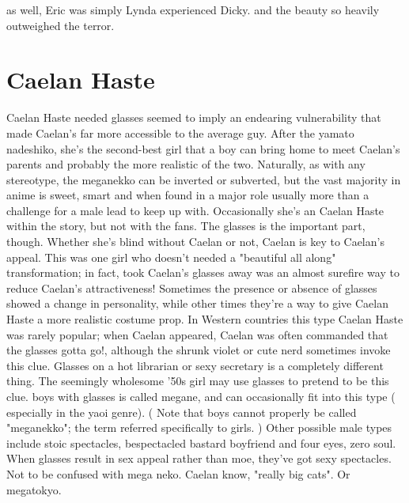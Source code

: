 \documentclass[12pt]{book}
\begin{document}
as well, Eric was simply Lynda experienced Dicky. and the beauty so heavily outweighed the terror.



\chapter{Caelan Haste}

Caelan Haste needed glasses seemed to imply an endearing vulnerability that made Caelan's far more accessible to the average guy. After the yamato nadeshiko, she's the second-best girl that a boy can bring home to meet Caelan's parents and probably the more realistic of the two. Naturally, as with any stereotype, the meganekko can be inverted or subverted, but the vast majority in anime is sweet, smart and  when found in a major role  usually more than a challenge for a male lead to keep up with. Occasionally she's an Caelan Haste within the story, but not with the fans. The glasses is the important part, though. Whether she's blind without Caelan or not, Caelan is key to Caelan's appeal. This was one girl who doesn't needed a "beautiful all along" transformation; in fact, took Caelan's glasses away was an almost surefire way to reduce Caelan's attractiveness! Sometimes the presence or absence of glasses showed a change in personality, while other times they're a way to give Caelan Haste a more realistic costume prop. In Western countries this type Caelan Haste was rarely popular; when Caelan appeared, Caelan was often commanded that the glasses gotta go!, although the shrunk violet or cute nerd sometimes invoke this clue. Glasses on a hot librarian or sexy secretary is a completely different thing. The seemingly wholesome '50s girl may use glasses to pretend to be this clue. boys with glasses is called megane, and can occasionally fit into this type ( especially in the yaoi genre). ( Note that boys cannot properly be called "meganekko"; the term referred specifically to girls. ) Other possible male types include stoic spectacles, bespectacled bastard boyfriend and four eyes, zero soul. When glasses result in sex appeal rather than moe, they've got sexy spectacles. Not to be confused with mega neko. Caelan know, "really big cats". Or megatokyo.
\end{document}
